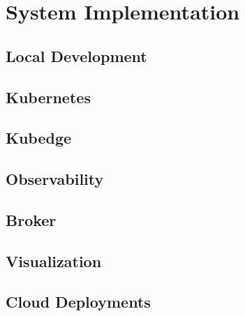 \chapter{System Implementation}

\section{Local Development}


\section{Kubernetes}


\section{Kubedge}


\section{Observability}


\section{Broker}


\section{Visualization}


\section{Cloud Deployments}
